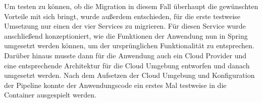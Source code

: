 Um testen zu können, ob die Migration in diesem Fall überhaupt die gewünschten Vorteile mit sich bringt, wurde außerdem entschieden, für die erste testweise Umsetzung nur einen der vier Services zu migrieren. Für diesen Service wurde anschließend konzeptioniert, wie die Funktionen der Anwendung nun in Spring umgesetzt werden können, um der ursprünglichen Funktionalität zu entsprechen. Darüber hinaus musste dann für die Anwendung auch ein Cloud Provider und eine entsprechende Architektur für die Cloud Umgebung entworfen und danach umgesetzt werden. Nach dem Aufsetzen der Cloud Umgebung und Konfiguration der Pipeline konnte der Anwendungscode ein erstes Mal testweise in die Container ausgespielt werden. \pagebreak